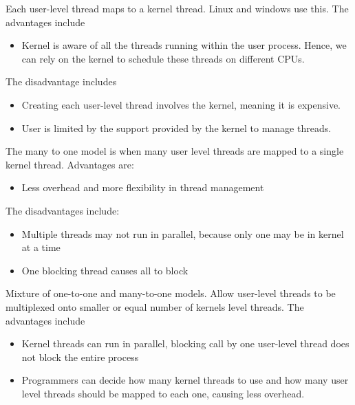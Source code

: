 \documentclass[a4paper]{article}
\theoremstyle{plain}
\theoremstyle{definition}
\newtheorem{defn}{Definition}[section]
\theoremstyle{remark}
\begin{document}
\begin{tcolorbox}[colback=black!3!white,colframe=black!60!white,title=\begin{defn}One-to-one model \label{One-to-one model}\end{defn}]
Each user-level thread maps to a kernel thread. Linux and windows use this. The advantages include
\begin{itemize}
	\item Kernel is aware of all the threads running within the user process. Hence, we can rely on the kernel to schedule these threads on different CPUs.
\end{itemize}
The disadvantage includes
\begin{itemize}
	\item Creating each user-level thread involves the kernel, meaning it is expensive.
	\item User is limited by the support provided by the kernel to manage threads.
\end{itemize}
\end{tcolorbox}
\begin{tcolorbox}[colback=black!3!white,colframe=black!60!white,title=\begin{defn}Many-to-one model \label{Many-to-one model}\end{defn}]
The many to one model is when many user level threads are mapped to a single kernel thread.
Advantages are:
\begin{itemize}
	\item Less overhead and more flexibility in thread management
\end{itemize}
The disadvantages include:
\begin{itemize}
	\item Multiple threads may not run in parallel, because only one may be in kernel at a time
	\item One blocking thread causes all to block
\end{itemize}
\end{tcolorbox}
\begin{tcolorbox}[colback=black!3!white,colframe=black!60!white,title=\begin{defn}Many-tomany model \label{Many-tomany model}\end{defn}]
Mixture of one-to-one and many-to-one models. Allow user-level threads to be multiplexed onto smaller or equal number of kernels level threads. The advantages include
\begin{itemize}
	\item Kernel threads can run in parallel, blocking call by one user-level thread does not block the entire process
	\item Programmers can decide how many kernel threads to use and how many user level threads should be mapped to each one, causing less overhead.
\end{itemize}
\end{tcolorbox}
\end{document}

